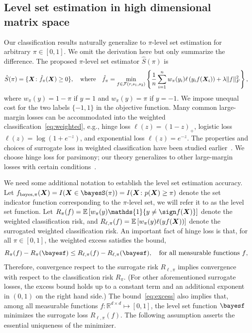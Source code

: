 \documentclass[12pt]{article}
\begin{document}
\subsection{Level set estimation in high dimensional matrix space}\label{subsec:pb2}
Our classification results naturally generalize to $\pi$-level set estimation for arbitrary $\pi\in[0,1]$. We omit the derivation here but only summarize the difference. The proposed $\pi$-level set estimator $\hat S(\pi)$ is
\begin{align}
\label{eq:weighted}
\hat S(\pi) = \{\bm X \colon \hat f_\pi(\bm X) \geq 0\}, \quad \text{where}\quad \hat f_\pi=\min_{f\in\mathcal{F}(r,s_1,s_2)}\left\{ {1\over n}\sum_{i=1}^n w_{\pi}(y_i)\ell\left(y_if(\bm X_i)\right)+ \lambda \lVert f\rVert_F^2\right\},
\end{align}
where $w_\pi(y) = 1-\pi $ if $y = 1$ and $w_\pi(y)=\pi$ if $y = -1$. We impose unequal cost for the two labels $\{-1,1\}$ in the objective function. Many common large-margin losses can be accommodated into the weighted classification~\eqref{eq:weighted}, e.g., hinge loss $\ell(z) = (1-z)_+$, logistic loss $\ell(z) =\log(1+e^{-z})$, and exponential loss $\ell(z)=e^{-z}$. The properties and choices of surrogate loss in weighted classification have been studied earlier~\citep{scott2011surrogate,bartlett2006convexity}. We choose hinge loss for parsimony; our theory generalizes to other large-margin losses with certain conditions~\citep{scott2011surrogate}.


We need some additional notation to establish the level set estimation accuracy. Let $f_{\text{bayes},\pi}(\mX)=I(\mX\in \bayesS(\pi))=I(\mX\colon p(\mX) \geq \pi)$ denote the set indicator function corresponding to the $\pi$-level set, we will refer it to as the level set function. Let $R_{\pi}(f)=\mathbb{E}\left[w_\pi(y)\mathds{1}\{y\neq \sign f(\mX)\}\right]$ denote the weighted classification risk, and $R_{\ell,\pi}(f)=\mathbb{E}\left[w_\pi(y)\ell(yf(\bm X))\right]$ denote the surrogated weighted classification risk. An important fact of hinge loss is that, for all $\pi\in[0,1]$, the weighted excess satisfies the bound,
\begin{equation}\label{eq:excess}
R_{\pi}(f)-R_{\pi}(\bayesf) \leq R_{\ell,\pi}(f)-R_{\ell,\pi}(\bayesf), \quad \text{for all measurable functions $f$},
\end{equation}
Therefore, convergence respect to the surrogate risk $R_{\ell,\pi}$ implies convergence with respect to the classification risk $R_{\pi}$. (For other aforementioned surrogate losses, the excess bound holds up to a constant term and an additional exponent in $(0,1)$ on the right hand side.) The bound~\eqref{eq:excess} also implies that, among all measurable functions $f\colon \mathbb{R}^{d\times d}\mapsto[0,1]$, the level set function $\bayesf$ minimizes the surrogate loss $R_{\ell,\pi}(f)$. The following assumption asserts the essential uniqueness of the minimizer. 
\end{document}
